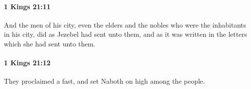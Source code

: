 		\paragraph{1 Kings 21:11} %
			\label{1KINGS-21-11}

			And the men of his city, even the elders and the nobles who were the inhabitants in his city, did as Jezebel had sent unto them, and as it was written in the letters which she had sent unto them.


		\paragraph{1 Kings 21:12} %
			\label{1KINGS-21-12}

			They proclaimed a fast, and set Naboth on high among the people.


